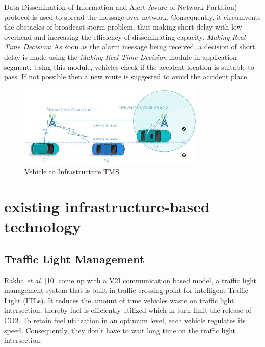 \documentclass[conference]{IEEEtran}
\begin{document}
Data Dissemination of Information and Alert Aware of Network
Partition) protocol is used to spread the message over network. Consequently, it circumvents the obstacles of broadcast storm problem, thus making short delay with low overhead and increasing the efficiency of disseminating capacity. \textit{Making Real Time Decision}: As soon as the alarm message being received, a decision of short delay is made using the \textit{Making Real Time Decision} module in application segment. Using this module, vehicles check if the accident location is suitable to pass. If not possible then a new route is suggested to avoid the accident place.








\begin{figure}[!ht]
\centering
\includegraphics[width=3.5in]{V2I}
\caption{Vehicle to Infrastructure TMS}
\label{fig_ldosAttProf}
\end{figure}











\section{existing infrastructure-based technology}
\subsection{Traffic Light Management}
Rakha \textit{et al.} [10] come up with a V2I communication based model, a traffic light management system that is built in traffic crossing point for  intelligent Traffic Light (ITLs). It reduces the amount of time vehicles waste on traffic light intersection, thereby fuel is efficiently utilized which in turn limit the release of CO2. To  retain fuel  utilization in an  optimum level, each  vehicle  regulates  its  speed. Consequently, they don't have to wait long time on the traffic light intersection. 
\end{document}
